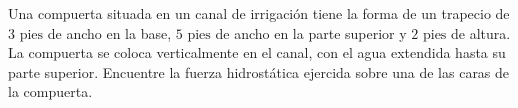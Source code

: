 \item Una compuerta situada en un canal de irrigación tiene la forma de un trapecio de $3 \text{ pies}$ de ancho en la base, $5 \text{ pies}$ de ancho en la parte superior y $2 \text{ pies}$ de altura. La compuerta se coloca verticalmente en el canal, con el agua extendida hasta su parte superior. Encuentre la fuerza hidrostática ejercida sobre una de las caras de la compuerta.
